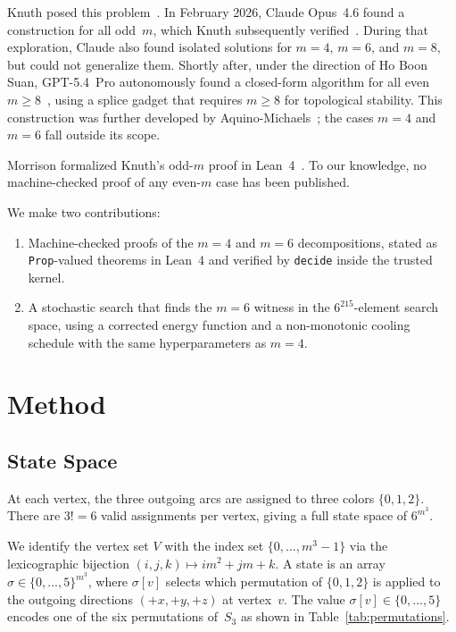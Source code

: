\documentclass[11pt]{article}
\theoremstyle{plain}
\begin{document}
Knuth posed this problem~\cite{knuth2026}. In February 2026, Claude Opus~4.6
found a construction for all odd~$m$, which Knuth subsequently
verified~\cite{knuth2026}. During that exploration, Claude also found
isolated solutions for $m = 4$, $m = 6$, and $m = 8$, but could not
generalize them. Shortly after, under the direction of Ho Boon Suan,
GPT-5.4~Pro autonomously found a closed-form algorithm for all even
$m \ge 8$~\cite{hoboonsuan2026}, using a splice gadget that requires $m \ge 8$
for topological stability. This construction was further developed by
Aquino-Michaels~\cite{aquino2026}; the cases $m = 4$ and $m = 6$ fall
outside its scope.

Morrison formalized Knuth's odd-$m$ proof in Lean~4~\cite{morrison2026}.
To our knowledge, no machine-checked proof of any even-$m$ case has been
published.

We make two contributions:
\begin{enumerate}
  \item Machine-checked proofs of the $m = 4$ and $m = 6$ decompositions,
  stated as \texttt{Prop}-valued theorems in Lean~4 and verified by
  \texttt{decide} inside the trusted kernel.
  \item A stochastic search that finds the $m=6$ witness in the
  $6^{215}$-element search space, using a corrected energy function and a
  non-monotonic cooling schedule with the same hyperparameters as $m=4$.
\end{enumerate}

\section{Method}

\subsection{State Space}

At each vertex, the three outgoing arcs are assigned to three colors
$\{0, 1, 2\}$. There are $3! = 6$ valid assignments per vertex, giving a
full state space of $6^{m^3}$.

We identify the vertex set $V$ with the index set $\{0, \ldots, m^3{-}1\}$
via the lexicographic bijection $(i,j,k) \mapsto im^2 + jm + k$.
A state is an array $\sigma \in \{0, \ldots, 5\}^{m^3}$, where
$\sigma[v]$ selects which permutation of $\{0,1,2\}$ is applied to the
outgoing directions $(+x, +y, +z)$ at vertex~$v$. The value
$\sigma[v] \in \{0,\ldots,5\}$ encodes one of the six permutations
of~$S_3$ as shown in Table~\ref{tab:permutations}.
\end{document}
